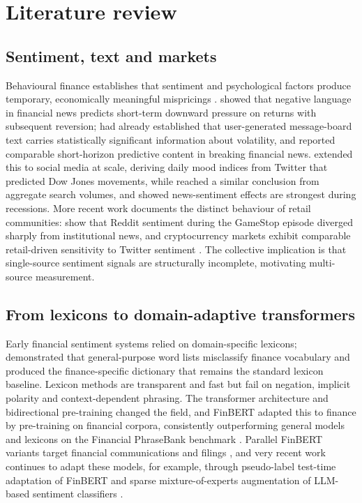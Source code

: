 \documentclass{aims}
\numberwithin{equation}{section}
\begin{document}
\section{Literature review}\label{sec:related}
\subsection{Sentiment, text and markets}
Behavioural finance establishes that sentiment and psychological factors produce
temporary, economically meaningful mispricings \citep{baker2006}. \citet{tetlock2007}
showed that negative language in financial news predicts short-term downward
pressure on returns with subsequent reversion; \citet{antweiler2004} had already
established that user-generated message-board text carries statistically
significant information about volatility, and \citet{schumaker2009} reported
comparable short-horizon predictive content in breaking financial news.
\citet{bollen2011} extended this to social
media at scale, deriving daily mood indices from Twitter that predicted Dow Jones
movements, while \citet{da2015} reached a similar conclusion from aggregate search
volumes, and \citet{garcia2013} showed news-sentiment effects are strongest during
recessions. More recent work documents the distinct behaviour of retail
communities: \citet{long2023} show that Reddit sentiment during the GameStop
episode diverged sharply from institutional news, and cryptocurrency markets
exhibit comparable retail-driven sensitivity to Twitter sentiment
\citep{kraaijeveld2020}. The collective implication is that single-source sentiment
signals are structurally incomplete, motivating multi-source measurement.

\subsection{From lexicons to domain-adaptive transformers}
Early financial sentiment systems relied on domain-specific lexicons;
\citet{loughran2011} demonstrated that general-purpose word lists misclassify
finance vocabulary and produced the finance-specific dictionary that remains the
standard lexicon baseline. Lexicon methods are transparent and fast but fail on
negation, implicit polarity and context-dependent phrasing. The transformer
architecture \citep{vaswani2017} and bidirectional pre-training \citep{devlin2019}
changed the field, and FinBERT \citep{araci2019} adapted this to finance by
pre-training on financial corpora, consistently outperforming general models and
lexicons on the Financial PhraseBank benchmark \citep{malo2014}. Parallel FinBERT
variants target financial communications and filings
\citep{yang2020,huang2023}, and very recent work continues to adapt these models, for
example, through pseudo-label test-time adaptation of FinBERT \citep{yang2026plta} and
sparse mixture-of-experts augmentation of LLM-based sentiment classifiers
\citep{li2026augment}.
\end{document}
